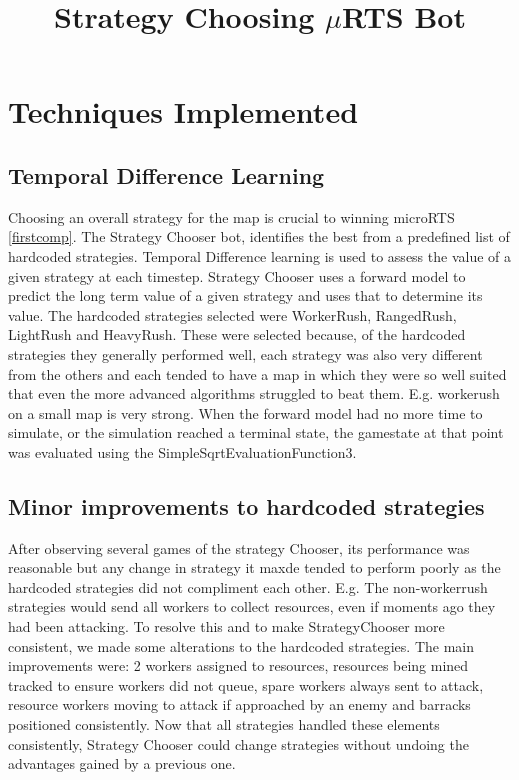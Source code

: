 \documentclass[]{article}
\title{Strategy Choosing $\mu$RTS Bot}
\author{}
\begin{document}
\maketitle

\begin{abstract}

\end{abstract}

\section{Techniques Implemented}


\subsection{Temporal Difference Learning}
Choosing an overall strategy for the map is crucial to winning microRTS \ref{firstcomp}. The Strategy Chooser bot, identifies the best from a predefined list of hardcoded strategies. Temporal Difference learning is used to assess the value of a given strategy at each timestep. Strategy Chooser uses a forward model to predict the long term value of a given strategy and uses that to determine its value. The hardcoded strategies selected were WorkerRush, RangedRush, LightRush and HeavyRush. These were selected because, of the hardcoded strategies they generally performed well, each strategy was also very different from the others and each tended to have a map in which they were so well suited that even the more advanced algorithms struggled to beat them. E.g. workerush on a small map is very strong. When the forward model had no more time to simulate, or the simulation reached a terminal state, the gamestate at that point was evaluated using the SimpleSqrtEvaluationFunction3. 

\subsection{Minor improvements to hardcoded strategies}
After observing several games of the strategy Chooser, its performance was reasonable but any change in strategy it maxde tended to perform poorly as the hardcoded strategies did not compliment each other. E.g. The non-workerrush strategies would send all workers to collect resources, even if moments ago they had been attacking. To resolve this and to make StrategyChooser more consistent, we made some alterations to the hardcoded strategies. The main improvements were: 2 workers assigned to resources, resources being mined tracked to ensure workers did not queue, spare workers always sent to attack, resource workers moving to attack if approached by an enemy and barracks positioned consistently. Now that all strategies handled these elements consistently, Strategy Chooser could change strategies without undoing the advantages gained by a previous one. 
\end{document}
